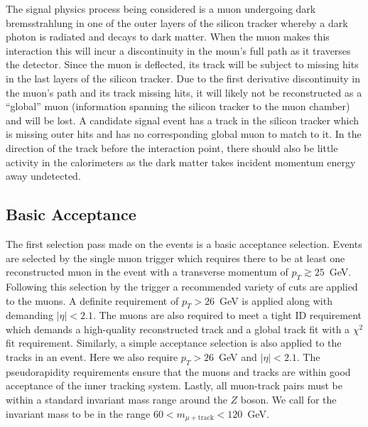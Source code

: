 \documentclass[a4paper,12pt]{article}
\begin{document}
        The signal physics process being considered is a muon undergoing
        dark bremsstrahlung in one of the outer layers of the silicon tracker
        whereby a dark photon is radiated and decays to dark matter. When the
        muon makes this interaction this will incur a discontinuity in the
        moun's full path as it traverses the detector. Since the muon is
        deflected, its track will be subject to missing hits in the last layers
        of the silicon tracker. Due to the first derivative discontinuity in the
        muon's path and its track missing hits, it will likely not be
        reconstructed as a ``global'' muon (information spanning the silicon
        tracker to the muon chamber) and will be lost. A candidate signal event
        has a track in the silicon tracker which is missing outer hits and has
        no corresponding global muon to match to it. In the direction of the
        track before the interaction point, there should also be little
        activity in the calorimeters as the dark matter takes incident momentum
        energy away undetected.

    \subsection{Basic Acceptance}

        The first selection pass made on the events is a basic acceptance
        selection. Events are selected by the single muon trigger which requires
        there to be at least one reconstructed muon in the event with a
        transverse momentum of $p_{T} \gtrsim 25$~GeV.  Following this selection
        by the trigger a recommended variety of cuts are applied to the
        muons. A definite requirement of $p_{T} > 26$~GeV is applied
        along with demanding $|\eta| < 2.1$. The muons are also
        required to meet a tight ID requirement which demands a high-quality
        reconstructed track and a global track fit with a $\chi^2$ fit
        requirement. Similarly, a simple acceptance selection is also applied to
        the tracks in an event.  Here we also require $p_{T} > 26$~GeV and
        $|\eta| < 2.1$. The pseudorapidity requirements ensure that the muons
        and tracks are within good acceptance of the inner tracking system.
        Lastly, all muon-track pairs must be within a standard invariant mass
        range around the $Z$ boson. We call for the invariant mass to be in the
        range $60 < m_{\mu + \text{track}} < 120$~GeV.
\end{document}
